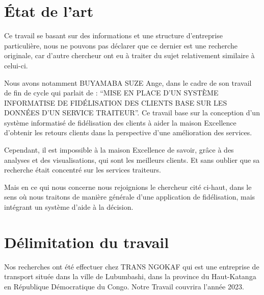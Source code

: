     \section[Etat de l'art]{État de l’art}
    Ce travail se basant sur des informations et une structure d’entreprise particulière, nous ne
    pouvons pas déclarer que ce dernier est une recherche originale, car d’autre chercheur ont eu
    à traiter du sujet relativement similaire à celui-ci.
    \newline

    Nous avons notamment BUYAMABA SUZE Ange, dans le cadre de son travail de fin de cycle
    qui parlait de : \enquote{MISE EN PLACE D’UN SYSTÈME INFORMATISE DE FIDÉLISATION DES CLIENTS BASE SUR LES
    DONNÉES D’UN SERVICE TRAITEUR}. Ce travail base sur la conception d’un système informatisé de fidélisation des clients
    à aider la maison Excellence d’obtenir les retours clients dans la perspective d’une amélioration des services. \cite{Buyamba2017}
    \newline

    Cependant, il est impossible à la maison Excellence de savoir, grâce à des analyses et des visualisations, qui
    sont les meilleurs clients. Et sans oublier que sa recherche était concentré sur les services traiteurs. 
    \newline

    Mais en ce qui nous concerne nous rejoignions le chercheur cité ci-haut, dans le sens où nous traitons de manière
    générale d’une application de fidélisation, mais intégrant un système d’aide à la décision.
    \section[Délimitation du travail]{Délimitation du travail}
        Nos recherches ont été effectuer chez TRANS NGOKAF qui est une entreprise de transport
        située dans la ville de Lubumbashi, dans la province du Haut-Katanga en République Démocratique du Congo.
        \newline
        Notre Travail couvrira l’année 2023.
